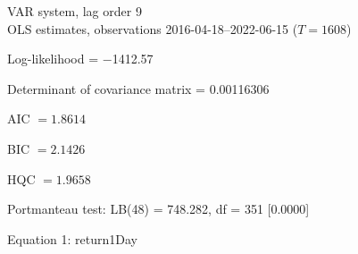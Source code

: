 \begin{center}
VAR system, lag order 9\\
OLS estimates, observations 2016-04-18--2022-06-15 ($T=1608$)
\end{center}
\noindent
Log-likelihood = $-$1412.57\par
\noindent
Determinant of covariance matrix = 0.00116306\par
\noindent
AIC $= 1.8614$ \par
\noindent
BIC $= 2.1426$ \par
\noindent
HQC $= 1.9658$ \par
\noindent
Portmanteau test: LB(48) = 748.282, df = 351 [0.0000]\par
\begin{center}

Equation 1: return1Day\\


\end{center}
